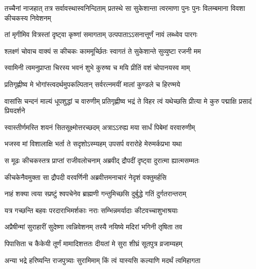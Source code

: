 \onelineshloka
{तच्चैनां नाजहात् तत्र सर्वावस्थास्वनिन्दिताम्}
\twolineshloka
{प्रतस्थे सा सुकेशान्ता त्वरमाणा पुनः पुनः}
{विलम्बमाना विवशा कीचकस्य निवेशनम्}


\twolineshloka
{तां मृगीमिव वित्रस्तां दृष्ट्वा कृष्णां समागताम्}
{उत्पपाताऽऽसनात्तूर्णं नावं लब्ध्वेव पारगः}


\twolineshloka
{श्लक्ष्णं चोवाच वाक्यं स कीचकः काममूर्च्छितः}
{स्वागतं ते सुकेशान्ते सुव्युष्टा रजनी मम}


\twolineshloka
{स्वामिनी त्वमनुप्राप्ता चिरस्य भवनं शुभे}
{कुरुष्व च मयि प्रीतिं वशं चोपानयस्व माम्}


\twolineshloka
{प्रतिगृह्णीष्व मे भोगांस्त्वदर्थमुपकल्पितान्}
{सर्वरत्नमयीं मालां कुण्डले च हिरण्मये}





\threelineshloka
{वासांसि चन्दनं माल्यं धूपशुद्धां च वारुणीम्}
{प्रतिगृह्णीष्व भद्रं ते विहर त्वं यथेच्छसि}
{प्रीत्या मे कुरु पद्माक्षि प्रसादं प्रियदर्शने}


\twolineshloka
{स्वास्तीर्णमस्ति शयनं सितसूक्ष्मोत्तरच्छदम्}
{अत्राऽऽरुह्य मया सार्धं पिबेमां वरवारुणीम्}


\twolineshloka
{भजस्व मां विशालाक्षि भर्ता ते सदृशोऽस्म्यहम्}
{उपसर्प वरारोहे मेरुमर्कप्रभा यथा}



\twolineshloka
{स मूढः कीचकस्तत्र प्राप्तां राजीवलोचनाम्}
{अब्रवीद् द्रौपदीं दृष्ट्वा दुरात्मा ह्यात्मसम्मतः}


\twolineshloka
{कीचकेनैवमुक्ता सा द्रौपदी वरवर्णिनी}
{अब्रवीत्तमनाचारं नेदृशं वक्तुमर्हसि}


\twolineshloka
{नाहं शक्या त्वया स्प्रष्टुं श्वपचेनेव ब्राह्मणी}
{गन्तुमिच्छसि दुर्बुद्धे गतिं दुर्गतरान्तराम्}


\twolineshloka
{यत्र गच्छन्ति बहवः परदाराभिमर्शकाः}
{नराः सम्भिन्नमर्यादाः कीटवच्चाशुभाश्रयाः}


\twolineshloka
{अप्रैषीन्मां सुराहारीं सुदेष्णा त्वन्निवेशनम्}
{तस्यै नयिष्ये मदिरां भगिनी तृषिता तव}


\twolineshloka
{पिपासिता च कैकेयी तूर्णं मामादिशत्ततः}
{दीयतां मे सुरा शीघ्रं सूतपुत्र व्रजाम्यहम्}




\twolineshloka
{अन्या भद्रे हरिष्यन्ति राजपुत्र्याः सुरामिमाम्}
{किं त्वं यास्यसि कल्याणि मदर्थं त्वमिहागता}



